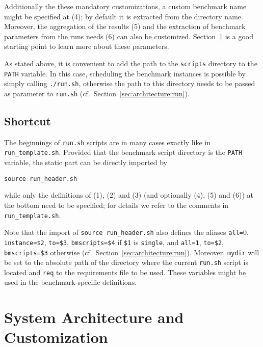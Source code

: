 \documentclass[a4paper]{article}
\begin{document}
			Additionally the these mandatory customizations, a custom benchmark name might be specified at (4);
			by default it is extracted from the directory name.
			Moreover, the aggregation of the results (5) and
			the extraction of benchmark parameters from the runs needs (6) can also be customized.
			Section~\ref{sec:architecture} is a good starting point to learn more about these parameters.
		
			As stated above, it is convenient to add the path to the {\tt scripts} directory to the {\tt PATH} variable.
			In this case, scheduling the benchmark instances is possible by simply calling {\tt ./run.sh},
			otherwise the path to this directory needs to be passed as parameter to {\tt run.sh}
			(cf.~Section~\ref{sec:architecture:run}).

		\subsection{Shortcut}
		\label{sec:usage:simplifying}

			The beginnings of {\tt run.sh} scripts are in many cases exactly
			like in {\tt run\_template.sh}. Provided that the benchmark script directory is the {\tt PATH} variable,
			the static part can be directly imported by
			\begin{center}
				{\tt source run\_header.sh}
			\end{center}
			while only the definitions of (1), (2) and (3) (and optionally (4), (5) and (6)) at the bottom need to be specified;
			for details we refer to the comments in {\tt run\_template.sh}.

			Note that the import of {\tt source run\_header.sh} also defines the aliases
			{\tt all=$0$}, {\tt instance=\$2}, {\tt to=\$3}, {\tt bmscripts=\$4}
			if {\tt \$1} is {\tt single}, and
			{\tt all=1}, {\tt to=\$2}, {\tt bmscripts=\$3} otherwise (cf.~Section~\ref{sec:architecture:run}).
			Moreover, {\tt mydir} will be set to the absolute path of the directory where
			the current {\tt run.sh} script is located and {\tt req} to the requirements file to be used.
			These variables might be used in the benchmark-specific definitions.

	\section{System Architecture and Customization}
	\label{sec:architecture}
\end{document}
